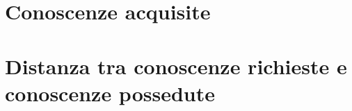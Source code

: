 
\section{Conoscenze acquisite}


\section{Distanza tra conoscenze richieste e conoscenze possedute}


